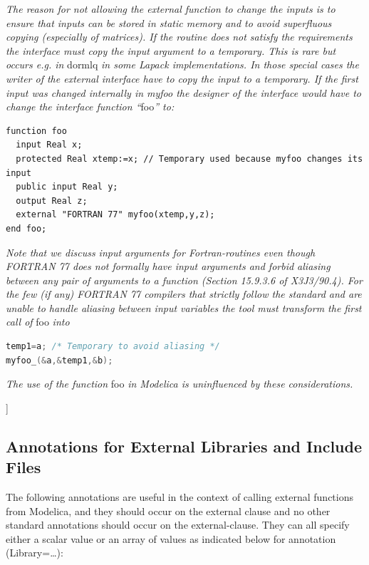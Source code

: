 \documentclass[10pt,a4paper]{report}
\def\doublelabel#1{\label{#1}}
\begin{document}
\emph{The reason for not allowing the external function to change the
inputs is to ensure that inputs can be stored in static memory and to
avoid superfluous copying (especially of matrices). If the routine does
not satisfy the requirements the interface must copy the input argument
to a temporary. This is rare but occurs e.g. in} dormlq \emph{in some
Lapack implementations. In those special cases the writer of the
external interface have to copy the input to a temporary. If the first
input was changed internally in myfoo the designer of the interface
would have to change the interface function ``}foo\emph{'' to:}

\begin{lstlisting}[language=modelica]
function foo
  input Real x;
  protected Real xtemp:=x; // Temporary used because myfoo changes its input
  public input Real y;
  output Real z;
  external "FORTRAN 77" myfoo(xtemp,y,z);
end foo;
\end{lstlisting}

\emph{Note that we discuss input arguments for Fortran-routines even
though FORTRAN 77 does not formally have input arguments and forbid
aliasing between any pair of arguments to a function (Section 15.9.3.6
of X3J3/90.4). For the few (if any) FORTRAN 77 compilers that strictly
follow the standard and are unable to handle aliasing between input
variables the tool must transform the first call of} foo \emph{into}
\begin{lstlisting}[language=C]
temp1=a; /* Temporary to avoid aliasing */
myfoo_(&a,&temp1,&b);
\end{lstlisting}

\emph{The use of the function} foo \emph{in Modelica is uninfluenced by
these considerations.}

{]}

\subsection{Annotations for External Libraries and Include Files}\doublelabel{annotations-for-external-libraries-and-include-files}

The following annotations are useful in the context of calling external
functions from Modelica, and they should occur on the external clause
and no other standard annotations should occur on the external-clause.
They can all specify either a scalar value or an array of values as
indicated below for annotation (Library=\ldots{}):
\end{document}
